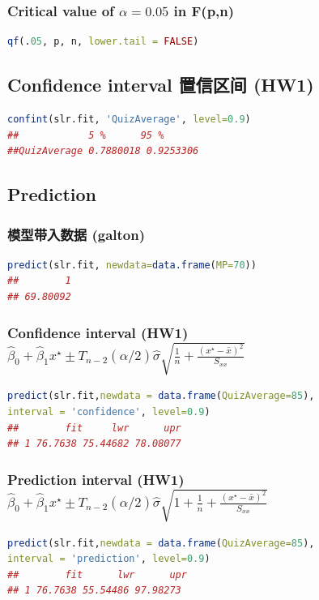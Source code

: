 \documentclass[11pt,a4paper]{article}
\begin{document}
\subsubsection{Critical value of $\alpha=0.05$ in F(p,n)}
\begin{lstlisting}[language=R]
qf(.05, p, n, lower.tail = FALSE)
\end{lstlisting}

\subsection{Confidence interval 置信区间 (HW1)}
\begin{lstlisting}[language=R]
confint(slr.fit, 'QuizAverage', level=0.9)
##            5 %      95 %
##QuizAverage 0.7880018 0.9253306
\end{lstlisting}







\subsection{Prediction}
\subsubsection{模型带入数据 (galton)}
\begin{lstlisting}[language=R]
predict(slr.fit, newdata=data.frame(MP=70))
##        1 
## 69.80092
\end{lstlisting}
\subsubsection{Confidence interval (HW1) $
\hat{\beta}_{0}+\hat{\beta}_{1} x^{\star} \pm T_{n-2}(\alpha / 2) \hat{\sigma} \sqrt{\frac{1}{n}+\frac{\left(x^{\star}-\bar{x}\right)^{2}}{S_{x x}}}
$}
\begin{lstlisting}[language=R]
predict(slr.fit,newdata = data.frame(QuizAverage=85),
interval = 'confidence', level=0.9)
##        fit     lwr      upr
## 1 76.7638 75.44682 78.08077
\end{lstlisting}
\subsubsection{Prediction interval (HW1) $
\hat{\beta}_{0}+\hat{\beta}_{1} x^{\star} \pm T_{n-2}(\alpha / 2) \hat{\sigma} \sqrt{1+\frac{1}{n}+\frac{\left(x^{\star}-\bar{x}\right)^{2}}{S_{x x}}}
$}
\begin{lstlisting}[language=R]
predict(slr.fit,newdata = data.frame(QuizAverage=85),
interval = 'prediction', level=0.9)
##        fit      lwr      upr
## 1 76.7638 55.54486 97.98273
\end{lstlisting}
\end{document}

